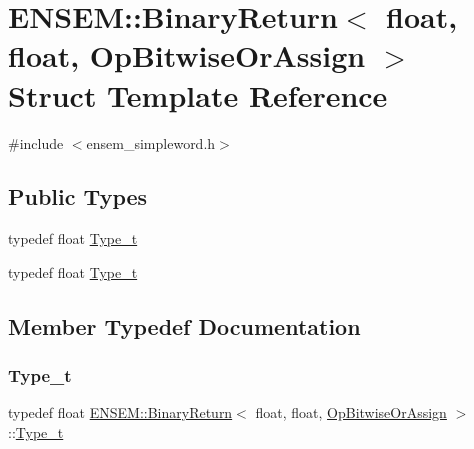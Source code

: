 \hypertarget{structENSEM_1_1BinaryReturn_3_01float_00_01float_00_01OpBitwiseOrAssign_01_4}{}\section{E\+N\+S\+EM\+:\+:Binary\+Return$<$ float, float, Op\+Bitwise\+Or\+Assign $>$ Struct Template Reference}
\label{structENSEM_1_1BinaryReturn_3_01float_00_01float_00_01OpBitwiseOrAssign_01_4}


{\ttfamily \#include $<$ensem\+\_\+simpleword.\+h$>$}

\subsection*{Public Types}
\begin{DoxyCompactItemize}
\item 
typedef float \mbox{\hyperlink{structENSEM_1_1BinaryReturn_3_01float_00_01float_00_01OpBitwiseOrAssign_01_4_a3e0892dc0a6beaa65d6fbf03b5fe3250}{Type\+\_\+t}}
\item 
typedef float \mbox{\hyperlink{structENSEM_1_1BinaryReturn_3_01float_00_01float_00_01OpBitwiseOrAssign_01_4_a3e0892dc0a6beaa65d6fbf03b5fe3250}{Type\+\_\+t}}
\end{DoxyCompactItemize}


\subsection{Member Typedef Documentation}
\mbox{\label{structENSEM_1_1BinaryReturn_3_01float_00_01float_00_01OpBitwiseOrAssign_01_4_a3e0892dc0a6beaa65d6fbf03b5fe3250}} 
\subsubsection{\texorpdfstring{Type\_t}{Type\_t}\hspace{0.1cm}{\footnotesize\ttfamily [1/2]}}
{\footnotesize\ttfamily typedef float \mbox{\hyperlink{structENSEM_1_1BinaryReturn}{E\+N\+S\+E\+M\+::\+Binary\+Return}}$<$ float, float, \mbox{\hyperlink{structENSEM_1_1OpBitwiseOrAssign}{Op\+Bitwise\+Or\+Assign}} $>$\+::\mbox{\hyperlink{structENSEM_1_1BinaryReturn_3_01float_00_01float_00_01OpBitwiseOrAssign_01_4_a3e0892dc0a6beaa65d6fbf03b5fe3250}{Type\+\_\+t}}}

